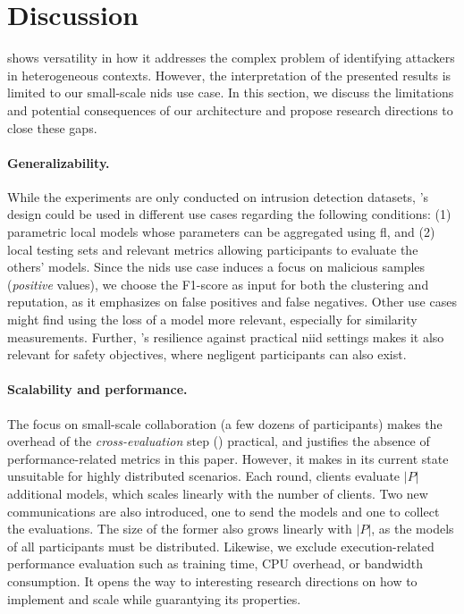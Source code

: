 \section{Discussion}\label{sec:discussion}

\thecontrib shows versatility in how it addresses the complex problem of identifying attackers in heterogeneous contexts.
However, the interpretation of the presented results is limited to our small-scale \gls{nids} use case.
In this section, we discuss the limitations and potential consequences of our architecture and propose research directions to close these gaps. 

\paragraph{Generalizability.} 

While the experiments are only conducted on intrusion detection datasets, \thecontrib's design could be used in different use cases regarding the following conditions: (1) parametric local models whose parameters can be aggregated using \gls{fl}, and (2) local testing sets and relevant metrics allowing participants to evaluate the others’ models.
Since the \gls{nids} use case induces a focus on malicious samples (\ie \emph{positive} values), we choose the F1-score as input for both the clustering and reputation, as it emphasizes on false positives and false negatives.
Other use cases might find using the loss of a model more relevant, especially for similarity measurements.
Further, \thecontrib's resilience against practical \gls{niid} settings makes it also relevant for safety objectives, where negligent participants can also exist.

\paragraph{Scalability and performance.}

The focus on small-scale collaboration (\ie a few dozens of participants) makes the overhead of the \emph{cross-evaluation} step () practical, and justifies the absence of performance-related metrics in this paper.
However, it makes \thecontrib in its current state unsuitable for highly distributed scenarios.
Each round, clients evaluate $|P|$ additional models, which scales linearly with the number of clients.
Two new communications are also introduced, one to send the models and one to collect the evaluations.
The size of the former also grows linearly with $|P|$, as the models of all participants must be distributed.
Likewise, we exclude execution-related performance evaluation such as training time, CPU overhead, or bandwidth consumption.
It opens the way to interesting research directions on how to implement and scale \thecontrib while guarantying its properties.


